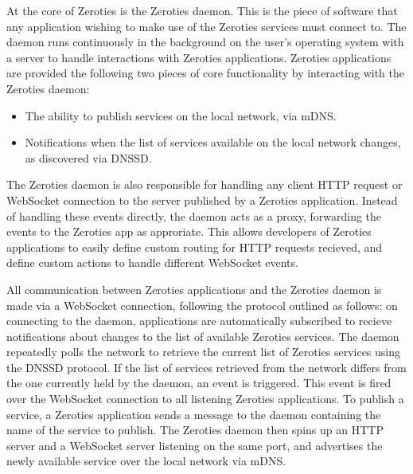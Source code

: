 At the core of Zeroties is the Zeroties daemon.
This is the piece of software that any application wishing to make use of the Zeroties services must connect to.
The daemon runs continuously in the background on the user's operating system with a server to handle interactions with Zeroties applications.
Zeroties applications are provided the following two pieces of core functionality by interacting with the Zeroties daemon:
\begin{itemize}
    \item The ability to publish services on the local network, via mDNS.
    \item Notifications when the list of services available on the local network changes, as discovered via DNSSD.
\end{itemize}
The Zeroties daemon is also responsible for handling any client HTTP request or WebSocket connection to the server published by a Zeroties application.
Instead of handling these events directly, the daemon acts as a proxy, forwarding the events to the Zeroties app as approriate.
This allows developers of Zeroties applications to easily define custom routing for HTTP requests recieved, and define custom actions to handle different WebSocket events.

All communication between Zeroties applications and the Zeroties daemon is made via a WebSocket connection, following the protocol outlined as follows: on connecting to the daemon, applications are automatically subscribed to recieve notifications about changes to the list of available Zeroties services.
The daemon repeatedly polls the network to retrieve the current list of Zeroties services using the DNSSD protocol.
If the list of services retrieved from the network differs from the one currently held by the daemon, an event is triggered.
This event is fired over the WebSocket connection to all listening Zeroties applications.
To publish a service, a Zeroties application sends a message to the daemon containing the name of the service to publish.
The Zeroties daemon then spins up an HTTP server and a WebSocket server listening on the same port, and advertises the newly available service over the local network via mDNS.





